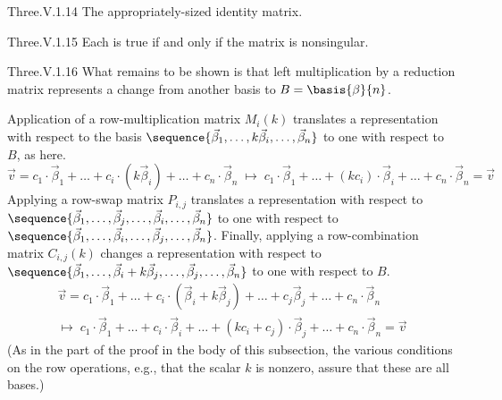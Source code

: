 \begin{ans}{Three.V.1.14}
       The appropriately-sized identity matrix.
     
\end{ans}
\begin{ans}{Three.V.1.15}
       Each is true if and only if the matrix is nonsingular.
    
\end{ans}
\begin{ans}{Three.V.1.16}
      What remains to be shown is that
      left multiplication by a reduction matrix represents a
      change from another basis to \( B=\basis{\beta}{n} \).

      Application of a row-multiplication matrix \( M_i(k) \) translates a
      representation with respect to the basis
      \( \sequence{\vec{\beta}_1,\dots,k\vec{\beta}_i,\dots,\vec{\beta}_n} \)
      to one with respect to \( B \), as here.
      \begin{equation*}
         \vec{v}=c_1\cdot\vec{\beta}_1+\dots+c_i\cdot(k\vec{\beta}_i)
                   +\dots+c_n\cdot\vec{\beta}_n
         \;\mapsto\;
         c_1\cdot\vec{\beta}_1+\dots
             +(kc_i)\cdot\vec{\beta}_i+\dots+c_n\cdot\vec{\beta}_n=\vec{v}
      \end{equation*}
      Applying a row-swap matrix \( P_{i,j} \) translates a representation
      with respect to
      \( \sequence{\vec{\beta}_1,\dots,\vec{\beta}_j,\dots,
        \vec{\beta}_i,\dots,\vec{\beta}_n} \)
      to one with respect to
            \( \sequence{\vec{\beta}_1,\dots,\vec{\beta}_i,\dots,
        \vec{\beta}_j,\dots,\vec{\beta}_n} \).
      Finally, applying a row-combination matrix \( C_{i,j}(k) \) changes a
      representation with respect to
      \( \sequence{\vec{\beta}_1,\dots,\vec{\beta}_i+k\vec{\beta}_j,\dots,
        \vec{\beta}_j,\dots,\vec{\beta}_n} \)
      to one with respect to \( B \).
      \begin{multline*}
         \vec{v}= c_1\cdot\vec{\beta}_1+\dots
                     +c_i\cdot(\vec{\beta}_i+k\vec{\beta}_j)
                       +\dots+c_j\vec{\beta}_j+\dots+c_n\cdot\vec{\beta}_n
         \\  \mapsto\;
         c_1\cdot\vec{\beta}_1+\dots+c_i\cdot\vec{\beta}_i
               +\dots+(kc_i+c_j)\cdot\vec{\beta}_j
               +\dots+c_n\cdot\vec{\beta}_n=\vec{v}
      \end{multline*}
      (As in the part of the proof in the body of this subsection,
      the various conditions on the
      row operations, e.g., that the scalar $k$ is nonzero, assure that these
      are all bases.)
    
\end{ans}
